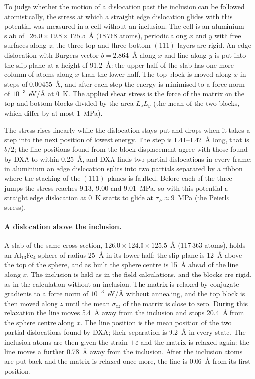 \documentclass[11pt,a4paper]{article}
\begin{document}
To judge whether the motion of a dislocation past the inclusion can be
followed atomistically, the stress at which a straight edge dislocation
glides with this potential was measured in a cell without an inclusion. The
cell is an aluminium slab of $126.0\times19.8\times125.5$~\AA{} (18\,768
atoms), periodic along $x$ and $y$ with free surfaces along $z$; the three
top and three bottom $(111)$ layers are rigid. An edge dislocation with
Burgers vector $b=2.864$~\AA{} along $x$ and line along $y$ is put into the
slip plane at a height of 91.2~\AA{}: the upper half of the slab has one
more column of atoms along $x$ than the lower half. The top block is moved
along $x$ in steps of 0.00455~\AA, and after each step the energy is
minimised to a force norm of $10^{-3}$~eV/\AA{} at 0~K. The applied shear
stress is the force of the matrix on the top and bottom blocks divided by
the area $L_xL_y$ (the mean of the two blocks, which differ by at most
1~MPa).

The stress rises linearly while the dislocation stays put and drops when it
takes a step into the next position of lowest energy. The step is
1.41--1.42~\AA{} long, that is $b/2$; the line positions found from the
block displacement agree with those found by DXA \cite{Stukowski2012DXA}
to within 0.25~\AA, and DXA finds two partial dislocations in every frame:
in aluminium an edge dislocation splits into two partials separated by a
ribbon where the stacking of the $(111)$ planes is faulted.
Before each of the three jumps the stress reaches 9.13, 9.00 and 9.01~MPa,
so with this potential a straight edge dislocation at 0~K starts to glide at
$\tau_P\approx9$~MPa (the Peierls stress).

\paragraph{A dislocation above the inclusion.} A slab of the same cross-section,
$126.0\times124.0\times125.5$~\AA{} (117\,363 atoms), holds an Al$_{13}$Fe$_4$
sphere of radius 25~\AA{} in its lower half; the slip plane is 12~\AA{} above
the top of the sphere, and as built the sphere centre is 15~\AA{} ahead of the
line along $x$. The inclusion is held as in the field calculations, and the
blocks are rigid, as in the calculation without an inclusion. The matrix is relaxed by conjugate gradients to a force norm
of $10^{-3}$~eV/\AA{} without annealing, and the top block is then moved along
$z$ until the mean $\sigma_{zz}$ of the matrix is close to zero. During this
relaxation the line moves 5.4~\AA{} away from the inclusion and stops
20.4~\AA{} from the sphere centre along $x$. The line position is the mean
position of the two partial dislocations found by DXA; their separation is
9.2~\AA{} in every state. The inclusion atoms are then given the strain
$+\varepsilon$ and the matrix is relaxed again: the line moves a further
0.78~\AA{} away from the inclusion. After the inclusion atoms are put
back and the matrix is relaxed once more, the line is 0.06~\AA{} from
its first position.
\end{document}
